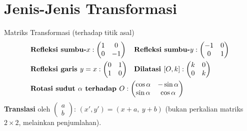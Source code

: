 \documentclass[11pt,a4paper]{report}
\theoremstyle{gaya}
\begin{document}
\section{Jenis-Jenis Transformasi}
\begin{konsep}{Matriks Transformasi (terhadap titik asal)}
\[
\begin{array}{ll}
\textbf{Refleksi sumbu-}x: \begin{pmatrix}1&0\\0&-1\end{pmatrix} &
\textbf{Refleksi sumbu-}y: \begin{pmatrix}-1&0\\0&1\end{pmatrix}\\[10pt]
\textbf{Refleksi garis }y=x: \begin{pmatrix}0&1\\1&0\end{pmatrix} &
\textbf{Dilatasi } [O,k]: \begin{pmatrix}k&0\\0&k\end{pmatrix}\\[10pt]
\multicolumn{2}{l}{\textbf{Rotasi sudut }\alpha\textbf{ terhadap }O: \begin{pmatrix}\cos\alpha&-\sin\alpha\\ \sin\alpha&\cos\alpha\end{pmatrix}}
\end{array}
\]
\textbf{Translasi} oleh $\begin{pmatrix}a\\b\end{pmatrix}$: $(x',y') = (x+a,\ y+b)$ (bukan perkalian matriks $2\times2$, melainkan penjumlahan).
\end{konsep}
\end{document}
